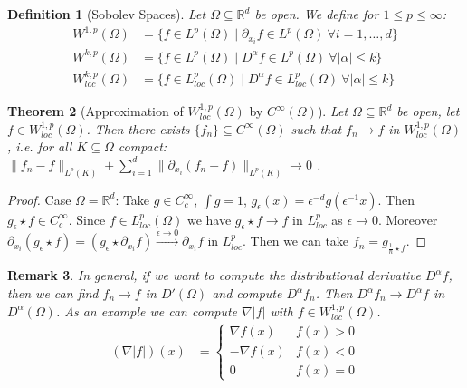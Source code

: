 \documentclass{report}
\theoremstyle{tommy}
\newtheorem{defn}{Definition}
\newtheorem{thm}[defn]{Theorem}
\newtheorem{rem}[defn]{Remark}
\begin{document}
  \begin{defn}[Sobolev Spaces]
    Let \(\Omega \subseteq \mathbb{R}^d\) be open. We define for \(1 \le p\le \infty\):
    \begin{align*}
      W^{1, p}(\Omega)
      &= \{f \in L^p(\Omega) \mid \partial_{x_i} f \in L^p(\Omega)\ \forall i=1, \dots, d \} \\
      W^{k, p}(\Omega)
      &= \{f \in L^p(\Omega) \mid D^\alpha f \in L^p(\Omega) \ \forall |\alpha|\le k \} \\
      W^{k, p}_{loc}(\Omega)
      &= \{f \in L_{loc}^p(\Omega) \mid D^\alpha f \in L_{loc}^p(\Omega) \ \forall |\alpha|\le k \}
    \end{align*}
  \end{defn}
  
  \begin{thm}[Approximation of \(W_{loc}^{1,p}(\Omega)\) by \(C^\infty(\Omega)\)]
    Let \(\Omega \subseteq \mathbb{R}^d\) be open, let \(f \in W_{loc}^{1,p}(\Omega)\). Then there exists \(\{f_n\} \subseteq C^\infty(\Omega)\) such that \(f_n \to f \) in \(W_{loc}^{1,p}(\Omega)\), i.e. for all \(K \subseteq \Omega\) compact: \(\|f_n - f\|_{L^p(K)} + \sum_{i=1}^d \| \partial_{x_i}(f_n - f)\|_{L^p(K)} \to 0\) .
  \end{thm}

  \begin{proof}
    Case \(\Omega = \mathbb{R}^d\): Take \(g \in C_c^\infty\), \(\int g = 1\), \(g_\epsilon(x) = \epsilon^{-d} g(\epsilon^{-1}x)\). Then \(g_\epsilon \star f \in C_c^\infty\). Since \(f \in L_{loc}^p(\Omega)\) we have \(g_\epsilon \star f \to f\) in \(L_{loc}^p\) as \(\epsilon \to 0\). Moreover \(\partial_{x_i} (g_\epsilon \star f) = (g_\epsilon \star \partial_{x_i} f)\xrightarrow{\epsilon \to 0} \partial_{x_i} f\) in \(L_{loc}^p\). Then we can take \(f_n = g_{\frac{1}{n} \star f}\).
  \end{proof}

  \begin{rem}
    In general, if we want to compute the distributional derivative \(D^\alpha f\), then we can find \(f_n \to f\) in \(D'(\Omega)\) and compute \(D^\alpha f_n\). Then \(D^\alpha f_n \to D^\alpha f\) in \(D^\alpha (\Omega)\). As an example we can compute \(\nabla |f|\) with \(f \in W_{loc}^{1,p}(\Omega)\).
    \begin{align*}
      (\nabla |f|)(x)
      &= \begin{cases}
        \nabla f(x) & f(x) > 0 \\
        - \nabla f(x) & f(x) < 0 \\
        0 & f(x) = 0
      \end{cases}
    \end{align*}
  \end{rem}
  
\end{document}
